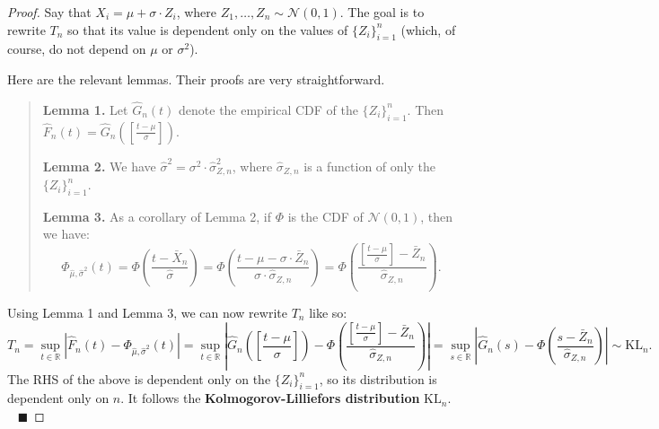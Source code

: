 \begin{proof}
    Say that $X_i = \mu + \sigma \cdot Z_i$,
    where $Z_1, \dots, Z_n \sim \mathcal{N}(0, 1)$.
    The goal is to rewrite $T_n$
    so that its value is dependent only on
    the values of $\{Z_i\}_{i = 1}^n$
    (which, of course, do not depend on $\mu$ or $\sigma^2$).

    Here are the relevant lemmas.
    Their proofs are very straightforward.

    \begin{quote}
        \textbf{Lemma 1.}
        Let $\hat{G}_n(t)$ denote the empirical CDF of the $\{Z_i\}_{i = 1}^n$.
        Then $\hat{F}_n(t) = \hat{G}_n\left(
            \left[\frac{t - \mu}{\sigma}\right]
        \right)$.

        \textbf{Lemma 2.}
        We have $\hat{\sigma}^2
        = \sigma^2 \cdot \hat{\sigma}_{Z, n}^2$,
        where $\hat{\sigma}_{Z, n}$ is
        a function of only the $\{Z_i\}_{i = 1}^n$.

        \textbf{Lemma 3.}
        As a corollary of Lemma 2,
        if $\Phi$ is the CDF of $\mathcal{N}(0, 1)$,
        then we have:
        \[ \Phi_{\hat{\mu}, \hat{\sigma}^2}(t)
        = \Phi\left(\frac{t - \bar{X}_n}{\hat{\sigma}}\right)
        = \Phi\left(\frac{
                t - \mu - \sigma \cdot \bar{Z}_n
            }{
                \sigma \cdot \hat{\sigma}_{Z, n}
            }\right)
        = \Phi\left(
            \frac{\left[\frac{t - \mu}{\sigma}\right]
            - \bar{Z}_n}{\hat{\sigma}_{Z, n}}
        \right). \]
    \end{quote}
    Using Lemma 1 and Lemma 3,
    we can now rewrite $T_n$ like so:
    \[
        T_n = \sup_{t \in \mathbb{R}} \left|
            \hat{F}_n(t) - \Phi_{\hat{\mu}, \hat{\sigma}^2}(t)
        \right|
        = \sup_{t \in \mathbb{R}} \left|
            \hat{G}_n\left(
                \left[\frac{t - \mu}{\sigma}\right]
            \right) -
            \Phi\left(
                \frac{\left[\frac{t - \mu}{\sigma}\right]
                - \bar{Z}_n}{\hat{\sigma}_{Z, n}}
            \right)
        \right|
        = \sup_{s \in \mathbb{R}} \left|
            \hat{G}_n(s) -
            \Phi\left(\frac{s - \bar{Z}_n}{\hat{\sigma}_{Z, n}}\right)
        \right| \sim \mathrm{KL}_n.
    \]
    The RHS of the above is dependent only on the $\{Z_i\}_{i = 1}^n$,
    so its distribution is dependent only on $n$.
    It follows the \textbf{Kolmogorov-Lilliefors distribution} $\mathrm{KL}_n$.
    ~ $\blacksquare$
\end{proof}

